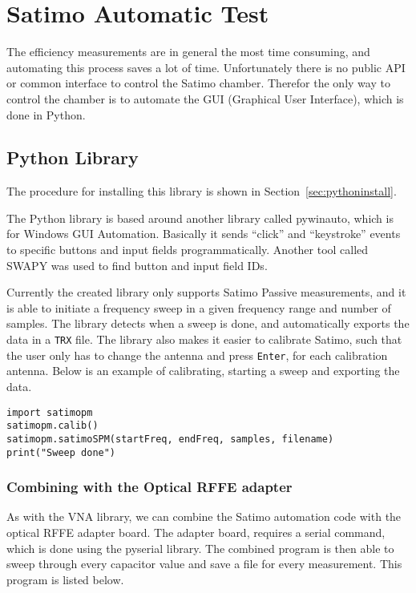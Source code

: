 \section{Satimo Automatic Test}
\label{sec:satimo_python}
The efficiency measurements are in general the most time consuming, and automating this process saves a lot of time. Unfortunately there is no public API or common interface to control the Satimo chamber. Therefor the only way to control the chamber is to automate the GUI (Graphical User Interface), which is done in Python.

\subsection{Python Library}
The procedure for installing this library is shown in Section~\ref{sec:pythoninstall}.

The Python library is based around another library called pywinauto, which is for Windows GUI Automation. Basically it sends ``click'' and ``keystroke'' events to specific buttons and input fields programmatically. Another tool called SWAPY was used to find button and input field IDs. 

Currently the created library only supports Satimo Passive measurements, and it is able to initiate a frequency sweep in a given frequency range and number of samples. The library detects when a sweep is done, and automatically exports the data in a \verb|TRX| file. The library also makes it easier to calibrate Satimo, such that the user only has to change the antenna and press \verb|Enter|, for each calibration antenna. Below is an example of calibrating, starting a sweep and exporting the data.  

\begin{lstlisting}
import satimopm
satimopm.calib()
satimopm.satimoSPM(startFreq, endFreq, samples, filename)
print("Sweep done")
\end{lstlisting}
 
\subsubsection{Combining with the Optical RFFE adapter}
As with the VNA library, we can combine the Satimo automation code with the optical RFFE adapter board. The adapter board, requires a serial command, which is done using the pyserial library. The combined program is then able to sweep through every capacitor value and save a file for every measurement. This program is listed below. 

